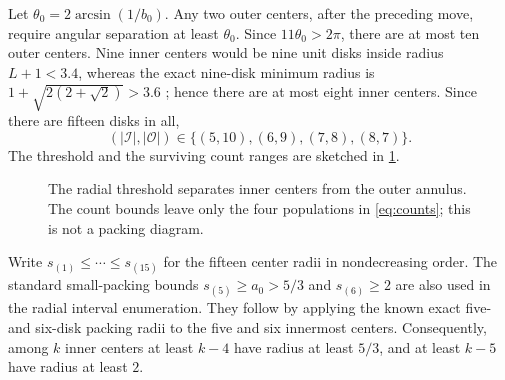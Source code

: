 \documentclass[11pt]{article}
\theoremstyle{definition}
\newcommand{\Iset}{\mathcal I}
\newcommand{\Oset}{\mathcal O}
\begin{document}
Let $\theta_0=2\arcsin(1/b_0)$. Any two outer centers, after the preceding move, require angular separation at least $\theta_0$. Since $11\theta_0>2\pi$, there are at most ten outer centers. Nine inner centers would be nine unit disks inside radius $L+1<3.4$, whereas the exact nine-disk minimum radius is $1+\sqrt{2(2+\sqrt2)}>3.6$ \cite{Pirl1969,Packomania}; hence there are at most eight inner centers. Since there are fifteen disks in all,
\begin{equation}\label{eq:counts}
(|\Iset|,|\Oset|)\in\{(5,10),(6,9),(7,8),(8,7)\}.
\end{equation}
The threshold and the surviving count ranges are sketched in \cref{fig:radial-shells}.

\begin{figure}[htbp]
\centering
{}
\caption{The radial threshold separates inner centers from the outer annulus. The count bounds leave only the four populations in \cref{eq:counts}; this is not a packing diagram.}
\label{fig:radial-shells}
\end{figure}

Write $s_{(1)}\le\cdots\le s_{(15)}$ for the fifteen center radii in nondecreasing order. The standard small-packing bounds $s_{(5)}\ge a_0>5/3$ and $s_{(6)}\ge2$ are also used in the radial interval enumeration. They follow by applying the known exact five- and six-disk packing radii to the five and six innermost centers. Consequently, among $k$ inner centers at least $k-4$ have radius at least $5/3$, and at least $k-5$ have radius at least $2$.
\end{document}
